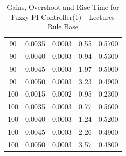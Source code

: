 \documentclass[12pt]{report}
\begin{document}
\begin{table}[H]
\begin{tabular}{|c|c|c|c|c|}
    90      & 0.0035  & 0.0003  &  0.55            & 0.5700 \\
    90      & 0.0040  & 0.0003  &  0.94            & 0.5300 \\
    90      & 0.0045  & 0.0003  &  1.97            & 0.5000 \\
    90      & 0.0050  & 0.0003  &  3.23            & 0.4900 \\
    100     & 0.0015  & 0.0002  &  0.95            & 0.2300 \\
    100     & 0.0035  & 0.0003  &  0.77            & 0.5600 \\
    100     & 0.0040  & 0.0003  &  1.24            & 0.5200 \\
    100     & 0.0045  & 0.0003  &  2.26            & 0.4900 \\
    100     & 0.0050  & 0.0003  &  3.57            & 0.4800 \\

    \hline
    \end{tabular}
    \caption{Gains, Overshoot and Rise Time for Fuzzy PI Controller(1) - Lectures Rule Base}
    \label{tab:lec_gains1}
\end{table}
\end{document}
